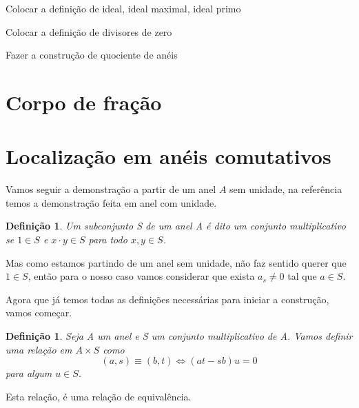 \documentclass[10pt,a4paper]{article}
\newtheorem{definition}[theorem]{Definição}
\begin{document}
 Colocar a definição de ideal, ideal maximal, ideal primo

 Colocar a definição de divisores de zero

 Fazer a construção de quociente de anéis


\section{Corpo de fração}

\section{Localização em anéis comutativos}

Vamos seguir a demonstração a partir de um anel $A$ sem unidade, na referência \cite{Atiyah} temos a demonstração feita em anel com unidade.

\begin{definition}
	Um subconjunto S de um anel A é dito um conjunto multiplicativo se $1 \in S$ e $ x\cdot y \in S$ para todo $x , y \in S$.
\end{definition}

Mas como estamos partindo de um anel sem unidade, não faz sentido querer que $1 \in S$, então para o nosso caso vamos considerar que exista $a_s \neq 0$ tal que $a \in S$.

Agora que já temos todas as definições necessárias para iniciar a construção, vamos começar.

\begin{definition}
	Seja A um anel e S um conjunto multiplicativo de A. Vamos definir uma relação em $A \times S$ como $$(a,s) \equiv (b, t) \Leftrightarrow (at-sb)u=0$$ para algum $u \in S$.
\end{definition}

Esta relação, é uma relação de equivalência.
\end{document}
